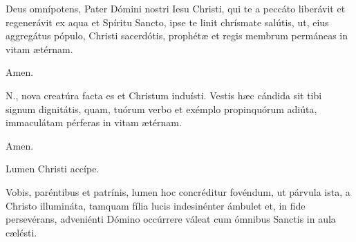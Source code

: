 
Deus omnípotens, Pater Dómini nostri Iesu Christi, qui te a peccáto liberávit et regenerávit ex aqua et
Spíritu Sancto, ipse te linit chrísmate salútis, ut, eius aggregátus pópulo, Christi sacerdótis,
prophétæ et regis membrum permáneas in vitam ætérnam.

 Amen.



 {\color{red}N.}, nova creatúra facta es et Christum induísti.
Vestis hæc cándida sit tibi signum dignitátis, quam, tuórum verbo et exémplo propinquórum adiúta,
immaculátam pérferas in vitam ætérnam.

 Amen.



 Lumen Christi accípe.


 Vobis, paréntibus et patrínis, lumen hoc concréditur fovéndum,
ut párvula ista, a Christo illumináta, tamquam fília lucis indesinénter ámbulet et,
in fide persevérans, adveniénti Dómino occúrrere váleat cum ómnibus Sanctis in aula
cælésti.

